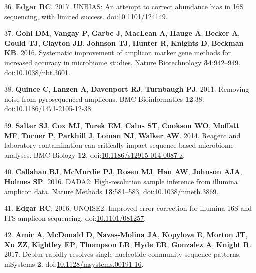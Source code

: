 \documentclass[11pt,]{article}
\begin{document}
\leavevmode\hypertarget{ref-Edgar2017}{}%
36. \textbf{Edgar RC}. 2017. UNBIAS: An attempt to correct abundance
bias in 16S sequencing, with limited success.
doi:\href{https://doi.org/10.1101/124149}{10.1101/124149}.

\leavevmode\hypertarget{ref-Gohl2016}{}%
37. \textbf{Gohl DM}, \textbf{Vangay P}, \textbf{Garbe J},
\textbf{MacLean A}, \textbf{Hauge A}, \textbf{Becker A}, \textbf{Gould
TJ}, \textbf{Clayton JB}, \textbf{Johnson TJ}, \textbf{Hunter R},
\textbf{Knights D}, \textbf{Beckman KB}. 2016. Systematic improvement of
amplicon marker gene methods for increased accuracy in microbiome
studies. Nature Biotechnology \textbf{34}:942--949.
doi:\href{https://doi.org/10.1038/nbt.3601}{10.1038/nbt.3601}.

\leavevmode\hypertarget{ref-Quince2011}{}%
38. \textbf{Quince C}, \textbf{Lanzen A}, \textbf{Davenport RJ},
\textbf{Turnbaugh PJ}. 2011. Removing noise from pyrosequenced
amplicons. BMC Bioinformatics \textbf{12}:38.
doi:\href{https://doi.org/10.1186/1471-2105-12-38}{10.1186/1471-2105-12-38}.

\leavevmode\hypertarget{ref-Salter2014}{}%
39. \textbf{Salter SJ}, \textbf{Cox MJ}, \textbf{Turek EM},
\textbf{Calus ST}, \textbf{Cookson WO}, \textbf{Moffatt MF},
\textbf{Turner P}, \textbf{Parkhill J}, \textbf{Loman NJ},
\textbf{Walker AW}. 2014. Reagent and laboratory contamination can
critically impact sequence-based microbiome analyses. BMC Biology
\textbf{12}.
doi:\href{https://doi.org/10.1186/s12915-014-0087-z}{10.1186/s12915-014-0087-z}.

\leavevmode\hypertarget{ref-Callahan2016}{}%
40. \textbf{Callahan BJ}, \textbf{McMurdie PJ}, \textbf{Rosen MJ},
\textbf{Han AW}, \textbf{Johnson AJA}, \textbf{Holmes SP}. 2016. DADA2:
High-resolution sample inference from illumina amplicon data. Nature
Methods \textbf{13}:581--583.
doi:\href{https://doi.org/10.1038/nmeth.3869}{10.1038/nmeth.3869}.

\leavevmode\hypertarget{ref-Edgar2016}{}%
41. \textbf{Edgar RC}. 2016. UNOISE2: Improved error-correction for
illumina 16S and ITS amplicon sequencing.
doi:\href{https://doi.org/10.1101/081257}{10.1101/081257}.

\leavevmode\hypertarget{ref-Amir2017a}{}%
42. \textbf{Amir A}, \textbf{McDonald D}, \textbf{Navas-Molina JA},
\textbf{Kopylova E}, \textbf{Morton JT}, \textbf{Xu ZZ},
\textbf{Kightley EP}, \textbf{Thompson LR}, \textbf{Hyde ER},
\textbf{Gonzalez A}, \textbf{Knight R}. 2017. Deblur rapidly resolves
single-nucleotide community sequence patterns. mSystems \textbf{2}.
doi:\href{https://doi.org/10.1128/msystems.00191-16}{10.1128/msystems.00191-16}.
\end{document}
